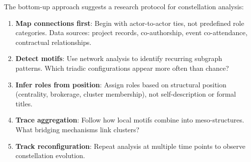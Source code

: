 The bottom-up approach suggests a research protocol for constellation analysis:

\begin{enumerate}[noitemsep,topsep=2pt]
    \item \textbf{Map connections first}: Begin with actor-to-actor ties, not predefined role categories. Data sources: project records, co-authorship, event co-attendance, contractual relationships.
    
    \item \textbf{Detect motifs}: Use network analysis to identify recurring subgraph patterns. Which triadic configurations appear more often than chance?
    
    \item \textbf{Infer roles from position}: Assign roles based on structural position (centrality, brokerage, cluster membership), not self-description or formal titles.
    
    \item \textbf{Trace aggregation}: Follow how local motifs combine into meso-structures. What bridging mechanisms link clusters?
    
    \item \textbf{Track reconfiguration}: Repeat analysis at multiple time points to observe constellation evolution.
\end{enumerate}

